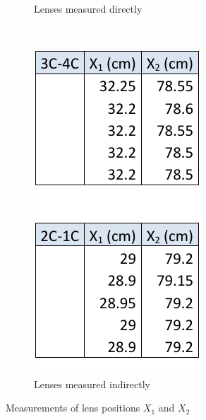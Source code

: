 \documentclass{scrreprt}
\begin{document}
\begin{figure}[H]
\begin{subfigure}[b]{0.3\textwidth}
                \caption{Lenses measured directly}
                \label{fig:direct}
        \end{subfigure}%
        ~
        \begin{subfigure}[b]{0.345\textwidth}
                \centering
                \includegraphics[width=\textwidth]{diag/two_lenses.pdf}
                \caption{Lenses measured indirectly}
                \label{fig:indirect}
        \end{subfigure}
        \caption{Measurements of lens positions $X_1$ and $X_2$}
        \label{fig:measurements}
\end{figure}
\end{document}
